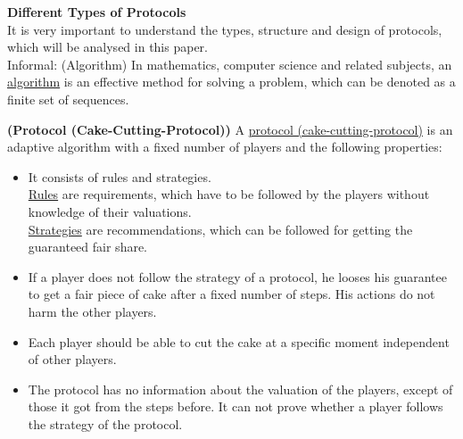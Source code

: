 \textbf{Different Types of Protocols}\\
\newline
It is very important to understand the types, structure and design of protocols, which will be analysed in this paper.\\
\newline
Informal: (Algorithm)
\newline In mathematics, computer science and related subjects, an
\underline{algorithm} is an effective method for solving a problem, which can be denoted as a finite set of sequences.
\begin{defi}{\textbf{(Protocol (Cake-Cutting-Protocol))}}
\newline A \underline{protocol (cake-cutting-protocol)} is an adaptive algorithm with a fixed number of players and the following properties:
\begin{itemize}
\item{It consists of rules and strategies.\\ \underline{Rules} are requirements, which have to be followed by the players without knowledge of their valuations.\\
\underline{Strategies} are recommendations, which can be followed for getting the guaranteed fair share.}
\item{If a player does not follow the strategy of a protocol, he looses his guarantee to get a fair piece of cake after a fixed number of steps. His actions do not harm the other players.}
\item Each player should be able to cut the cake at a specific moment independent of other players.
\item The protocol has no information about the valuation of the players, except of those it got from the steps before. It can not prove whether a player follows the strategy of the protocol.
\end{itemize}
\end{defi}
